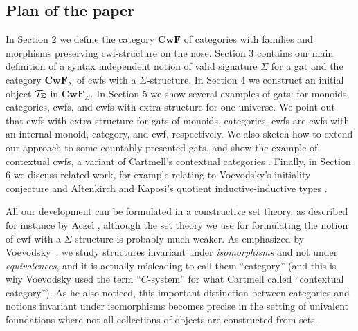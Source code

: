 \documentclass{lmcs}
\def\Cwf{\mathbf{CwF}}
\begin{document}

\subsection*{Plan of the paper}

In Section 2 we define the category $\Cwf$ of categories with families and morphisms preserving cwf-structure on the nose. Section 3 contains our main definition of a syntax independent notion of valid signature $\Sigma$ for a gat and the category $\Cwf_\Sigma$ of cwfs with a $\Sigma$-structure. In Section 4 we construct an initial object ${\mathcal T}_\Sigma$ in $\Cwf_\Sigma$. In Section 5 we show several examples of gats: for monoids, categories, cwfs, and cwfs with extra structure for one universe. We point out that cwfs with extra structure for gats of monoids, categories, cwfs are cwfs with an internal monoid, category, and cwf, respectively. We also sketch how to extend our approach to some countably presented gats, and show the example of contextual cwfs, a variant of Cartmell's contextual categories \cite{cartmell:phd,cartmell:apal}. Finally, in Section 6 we discuss related work, for example relating to Voevodsky's initiality conjecture \cite{voevodsky:initiality} and Altenkirch and Kaposi's quotient inductive-inductive types \cite{altenkirch:qiits}.

All our development can be formulated in a constructive set theory,
as described for instance by Aczel \cite{MR519801}, although the set theory
we use for formulating the notion of cwf with a $\Sigma$-structure is probably
much weaker. As emphasized by Voevodsky~\cite{voevodsky:initiality}, we study structures invariant
under {\em isomorphisms} and not under {\em equivalences}, and it is actually misleading
to call them ``category'' (and this is why Voevodsky used the term ``$C$-system''
for what Cartmell called ``contextual category'').
As he also noticed, this
important distinction between categories and notions invariant under isomorphisms becomes
precise in the setting of univalent foundations where not all collections of objects
are constructed from sets.
\end{document}

